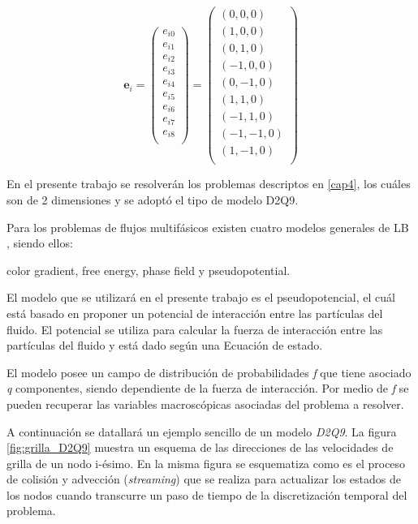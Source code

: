 \begin{equation}
{\mathbf{e}}_{i} =  
\left( \begin{array}{c} 
e_{i0} \\ e_{i1}\\ e_{i2}\\ e_{i3}\\ e_{i4}\\ e_{i5}\\
e_{i6}\\ e_{i7}\\ e_{i8}\\
\end{array}
\right) =
\left( \begin{array}{c} 
(0,0,0) \\ (1,0,0) \\ (0,1,0) \\(-1,0,0) \\ (0,-1,0) \\ (1,1,0) \\
(-1,1,0) \\ (-1,-1,0) \\ (1,-1,0)\\ 
\end{array}
\right) 
\label{eq:velgrilla}
\end{equation}




En el presente trabajo se resolverán los problemas descriptos en \ref{cap4}, los cuáles son de 2 dimensiones y se adoptó el tipo de modelo D2Q9. 



Para los problemas de flujos multifásicos existen cuatro modelos generales de LB , siendo ellos:

\qquad \qquad color gradient, free energy, phase field y pseudopotential.

El modelo que se utilizará en el presente trabajo es el pseudopotencial, el cuál está basado en proponer un potencial de interacción entre las partículas del fluido. El potencial se utiliza para calcular la fuerza de interacción entre las partículas del fluido y está dado según una Ecuación de estado. 




El modelo posee un campo de distribución de probabilidades \textit{f} que tiene asociado \textit{q} componentes, siendo dependiente de la fuerza de interacción. Por medio de \textit{f} se pueden recuperar las variables macroscópicas asociadas del problema a resolver.

A continuación se datallará un ejemplo sencillo de un modelo \textit{D2Q9}. La figura \ref{fig:grilla_D2Q9} muestra un esquema de las direcciones de las velocidades de grilla de un nodo i-ésimo. En la misma figura se esquematiza como  es el proceso de colisión y advección (\textit{streaming}) que se realiza para actualizar los estados de los nodos cuando transcurre un paso de tiempo de la discretización temporal del problema. 


